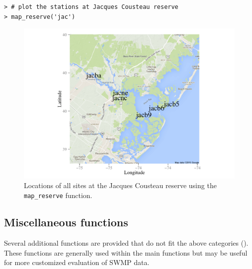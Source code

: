 \documentclass[10pt,letterpaper]{article}\usepackage[]{graphicx}\usepackage[]{color}
\makeatletter
\def\maxwidth{ %
  \ifdim\Gin@nat@width>\linewidth
    \linewidth
  \else
    \Gin@nat@width
  \fi
}
\newenvironment{kframe}{%
 \def\at@end@of@kframe{}%
 \ifinner\ifhmode%
  \def\at@end@of@kframe{\end{minipage}}%
  \begin{minipage}{\columnwidth}%
 \fi\fi%
 \def\FrameCommand##1{\hskip\@totalleftmargin \hskip-\fboxsep
 \colorbox{shadecolor}{##1}\hskip-\fboxsep
     \hskip-\linewidth \hskip-\@totalleftmargin \hskip\columnwidth}%
 \MakeFramed {\advance\hsize-\width
   \@totalleftmargin\z@ \linewidth\hsize
   \@setminipage}}%
 {\par\unskip\endMakeFramed%
 \at@end@of@kframe}
\newenvironment{knitrout}{}{} %
\makeatother
\begin{document}
\begin{knitrout}\small
{}\color{fgcolor}\begin{kframe}
\begin{verbatim}
> # plot the stations at Jacques Cousteau reserve
> map_reserve('jac')
\end{verbatim}
\end{kframe}\begin{figure}[!ht]


{\centering \includegraphics[width=\maxwidth]{figure/map_ex} 

}

\caption[Locations of all sites at the Jacques Cousteau reserve using the \texttt{map\_reserve} function]{Locations of all sites at the Jacques Cousteau reserve using the \texttt{map\_reserve} function.\label{fig:map_ex}}
\end{figure}


\end{knitrout}

\subsection*{Miscellaneous functions}

Several additional functions are provided that do not fit the above categories ().  These functions are generally used within the main functions but may be useful for more customized evaluation of \ac{SWMP} data.  
\end{document}

